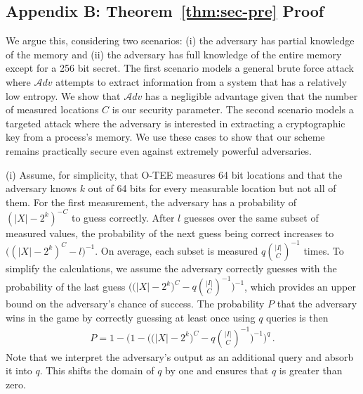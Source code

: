 \documentclass[letterpaper,twocolumn,10pt]{article}
\newcommand{\adv}{\mathcal{A}dv}
\begin{document}
\begin{appendices}
\section*{Appendix B: Theorem~\ref{thm:sec-pre} Proof}
\label{app:thm3proof}
We argue this,
considering two scenarios:
(i) the adversary has partial knowledge of the memory and (ii) the adversary has full knowledge of the entire memory except for a 256 bit secret.
{The first scenario models a general brute force attack where $\adv$ attempts to extract information from a system that has a relatively low entropy.
We show that $\adv$ has a negligible advantage given that the number of measured locations $C$ is our security parameter.
The second scenario models a targeted attack where the adversary is interested in extracting a cryptographic key from a process's memory.
We use these cases to show that our scheme remains practically secure even against extremely powerful adversaries.
}

(i) Assume, for simplicity, that O-TEE measures 64 bit locations and that the adversary knows $k$ out of 64 bits for every measurable location but not all of them.
For the first measurement, the adversary has a probability of $(|X|-2^k)^{-C}$ to guess correctly.
After $l$ guesses over the same subset of measured values, the probability of the next guess being correct increases to $\big((|X|-2^k)^{C} - l\big)^{-1}$.
On average, each subset is measured $q\binom{|I|}{C}^{-1}$ times.
To simplify the calculations, we assume the adversary correctly guesses with the probability of the last guess $\Big(\big(|X|-2^k\big)^{C} - q\binom{|I|}{C}^{-1}\Big)^{-1}$, which provides an upper bound on the adversary's chance of success.
The probability $P$ that the adversary wins in the game by correctly guessing at least once using $q$ queries is then
\begin{equation*}
  \begin{split}
    P = 1 - \Bigg(1 - \bigg(\Big(|X|-2^k\Big)^{C} - q\binom{|I|}{C}^{-1}\bigg)^{-1}\Bigg)^q \,.
  \end{split}
\end{equation*}
Note that we interpret the adversary's output as an additional query and absorb it into $q$. This shifts the domain of $q$ by one and ensures that $q$ is greater than zero.


\end{appendices}
\end{document}
